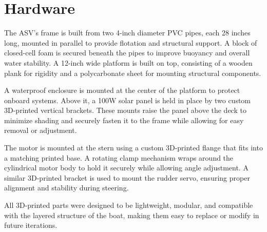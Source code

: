 \section{Hardware}

The ASV's frame is built from two 4-inch diameter PVC pipes, each 28 inches long, mounted in parallel to provide flotation and structural support. A block of closed-cell foam is secured beneath the pipes to improve buoyancy and overall water stability. A 12-inch wide platform is built on top, consisting of a wooden plank for rigidity and a polycarbonate sheet for mounting structural components.

A waterproof enclosure is mounted at the center of the platform to protect onboard systems. Above it, a 100W solar panel is held in place by two custom 3D-printed vertical brackets. These mounts raise the panel above the deck to minimize shading and securely fasten it to the frame while allowing for easy removal or adjustment.

The motor is mounted at the stern using a custom 3D-printed flange that fits into a matching printed base. A rotating clamp mechanism wraps around the cylindrical motor body to hold it securely while allowing angle adjustment. A similar 3D-printed bracket is used to mount the rudder servo, ensuring proper alignment and stability during steering.

All 3D-printed parts were designed to be lightweight, modular, and compatible with the layered structure of the boat, making them easy to replace or modify in future iterations.

